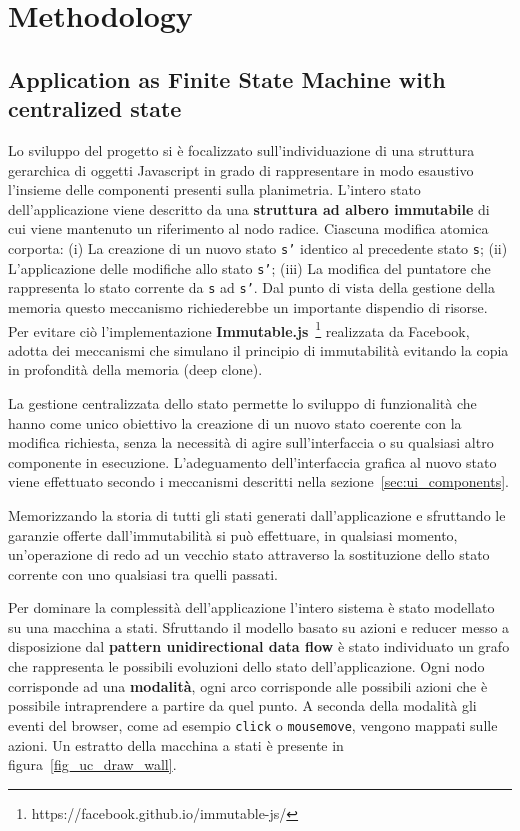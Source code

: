 \section{Methodology}\label{sec:methodology}

\subsection{Application as Finite State Machine with centralized state}\label{sec:central_state}
Lo sviluppo del progetto si \`e focalizzato sull'individuazione di una struttura gerarchica di oggetti Javascript in grado di rappresentare in modo esaustivo l'insieme delle componenti presenti sulla planimetria. L'intero stato dell'applicazione viene descritto da una \textbf{struttura ad albero immutabile} di cui viene mantenuto un riferimento al nodo radice. Ciascuna modifica atomica corporta: (i) La creazione di un nuovo stato \texttt{s'} identico al precedente stato \texttt{s}; (ii) L'applicazione delle modifiche allo stato \texttt{s'}; (iii) La modifica del puntatore che rappresenta lo stato corrente da \texttt{s} ad \texttt{s'}. Dal punto di vista della gestione della memoria questo meccanismo richiederebbe un importante dispendio di risorse. Per evitare ci\`o l'implementazione \textbf{Immutable.js}~\footnote{https://facebook.github.io/immutable-js/} realizzata da Facebook, adotta dei meccanismi che simulano il principio di immutabilit\`a evitando la copia in profondit\`a della memoria  (deep clone).

La gestione centralizzata dello stato permette lo sviluppo di funzionalità che hanno come unico obiettivo la creazione di un nuovo stato coerente con la modifica richiesta, senza la necessità di agire sull'interfaccia o su qualsiasi altro componente in esecuzione. L'adeguamento dell'interfaccia grafica al nuovo stato viene effettuato secondo i meccanismi descritti nella sezione~\ref{sec:ui_components}.

Memorizzando la storia di tutti gli stati generati dall'applicazione e sfruttando le garanzie offerte dall'immutabilità si può effettuare, in qualsiasi momento, un'operazione di redo ad un vecchio stato attraverso la sostituzione dello stato corrente con uno qualsiasi tra quelli passati.

Per dominare la complessit\`a dell'applicazione l'intero sistema \`e stato modellato su una macchina a stati. Sfruttando il modello basato su azioni e reducer messo a disposizione dal \textbf{pattern unidirectional data flow} \`e stato individuato un grafo che rappresenta le possibili evoluzioni dello stato dell'applicazione. Ogni nodo corrisponde ad una \textbf{modalit\`a}, ogni arco corrisponde alle possibili azioni che è possibile intraprendere a partire da quel punto. A seconda della modalit\`a gli eventi del browser, come ad esempio \texttt{click} o \texttt{mousemove}, vengono mappati sulle azioni. Un estratto della macchina a stati \`e presente in figura~\ref{fig_uc_draw_wall}.

